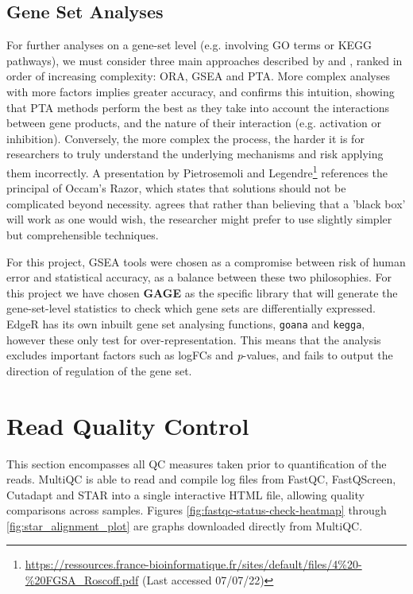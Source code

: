 \subsection{Gene Set Analyses}

For further analyses on a gene-set level (e.g. involving \ac{GO} terms or \ac{KEGG} pathways), we must consider three main approaches described by \cite{khatri2012ten} and \cite{alhamdoosh2017combining}, ranked in order of increasing complexity: \ac{ORA}, \ac{GSEA} and \ac{PTA}. More complex analyses with more factors implies greater accuracy, and \cite{nguyen2019identifying} confirms this intuition, showing that \ac{PTA} methods perform the best as they take into account the interactions between gene products, and the nature of their interaction (e.g. activation or inhibition). Conversely, the more complex the process, the harder it is for researchers to truly understand the underlying mechanisms and risk applying them incorrectly. A presentation by Pietrosemoli and Legendre\footnote{\url{https://ressources.france-bioinformatique.fr/sites/default/files/4\%20-\%20FGSA_Roscoff.pdf} (Last accessed 07/07/22)} references the principal of Occam’s Razor, which states that solutions should not be complicated beyond necessity. \cite{albert2020biostar} agrees that rather than believing that a 'black box' will work as one would wish, the researcher might prefer to use slightly simpler but comprehensible techniques.

For this project, \ac{GSEA} tools were chosen as a compromise between risk of human error and statistical accuracy, as a balance between these two philosophies. For this project we have chosen \textbf{GAGE} as the specific library that will generate the gene-set-level statistics to check which gene sets are differentially expressed. EdgeR has its own inbuilt gene set analysing functions, \texttt{goana} and \texttt{kegga}, however these only test for over-representation. This means that the analysis excludes important factors such as \ac{logFC}s and \textit{p}-values, and fails to output the direction of regulation of the gene set.

\section{Read Quality Control}

This section encompasses all QC measures taken prior to quantification of the reads. MultiQC is able to read and compile log files from FastQC, FastQScreen, Cutadapt and STAR into a single interactive HTML file, allowing quality comparisons across samples. Figures \ref{fig:fastqc-status-check-heatmap} through \ref{fig:star_alignment_plot} are graphs downloaded directly from MultiQC.


